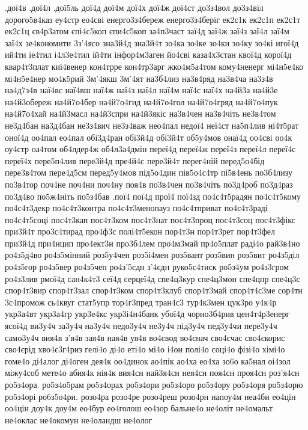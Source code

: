 {.дої4в
.дої4л
.дої5ль
дої4д
дої4м
дої4х
дої4ж
дої4ст
до3з4вол
до3з4віл
дорого5в4каз
еу4стр
ео4сві
енерго3з4береж
енерго3з4беріг
ек2с1к
ек2с1п
ек2с1т
ек2с1ц
єв4р3атом
єпі4с5коп
єпи4с5коп
за4п3част
заї4д
заї4ж
заї4з
заї4л
заї4м
заї4х
зе4кономити
3з'4ясо
зна3й4д
зна3й4т
зо4ка
зо4ке
зо4ки
зо4ку
зо4кі
игої4д
ий4ти
іе4тил
і4л3е4тил
ій4ти
інфор4м3аген
йо4сві
каза4х3стан
квої4д
корої4д
квар4т3плат
киї4венер
кон4трре
кон4тр3арг
жко4м5а4том
кому4ненерг
мі4н5е4ко
мі4н5е4нер
мо4к5рий
3м'4якш
3м'4ят
на3б4лиз
на3в4ряд
на3в4ча
на3з4в
на4д7з4в
наї4вс
наї4вш
наї4ж
наї4з
наї4л
наї4м
наї4с
наї4х
на4й3а
на4й3е
на4й3обереж
на4й7о4бер
на4й7о4гид
на4й7о4гол
на4й7о4гряд
на4й7о4пук
на4й7о4хай
на4й3масл
на4й3спри
на4й3якіс
на3в4чен
на3в4чіть
не3в4том
не3д4бан
на3д4бан
не3з4вич
не3з4важ
нео4пал
недої4
неї4ст
на5п4лив
ні4т5рат
оної4д
оо4пал
ео4пал
обі3д4ран
обі3й4д
обі3й4т
об5у4мов
онаї4д
оо4сві
оо4к
оу4стр
оа4том
об4лдер4ж
об4л3а4дмін
переї4д
переї4ж
переї4з
переї4л
переї4с
переї4х
пере5п4лив
пере3й4д
пре4й4с
пере3й4т
перег4ній
перед5о4бід
пере3в4том
пере4д5см
перед5у4мов
під5о4дин
пів5о4с4тр
пі5в4ень
по3б4лизу
по3в4тор
поч4не
поч4ни
поч4ну
поя4в
по3в4чен
по3в4чіть
по3д4роб
по3д4раз
по3д4во
по5ж4ніть
по5з4бав
.пої4
пої4д
прої4
пої4зд
по4с4т5радян
по4с4т5кому
по4с4т3декр
по4с4т3контра
по4с4т3менопауз
по4с4тприват
по4с4т3раді
по4с4т5соці
пос4т3кап
пос4т3ком
пос4т3нат
пос4т3проц
пос4т3соц
пос4т3фікс
при3й4т
про3с4тирад
про4ф3с
полі4т5екон
пор4т3н
пор4т3рет
пор4т3фел
при3й4д
при4нцип
про4ект3н
про3б4лем
про4м3май
пр4о5плат
раді4о
рай3в4но
ро4з5д4во
ро4з5мінний
роз5у4чен
роз5і4мен
роз5вант
роз5вин
роз5вит
ро4з5діл
ро4з5гор
ро4з5вер
ро4з5чеп
ро4з'5єдн
з'4єдн
руко5с4тиск
ро5з4ум
ро4з3гром
ро4з3лив
рмої4д
сан4к4т3
сеї4д
серцеї4д
спе4ц3кур
спе4ц3мон
спе4цпр
спе4ц3с
спор4т3вир
спор4т3зал
спор4т3ком
спор4т3клуб
спор4т3май
спор4т4с3ме
сор4тн
3с4промож
сь4квуг
стат5упр
тор4г3пред
тран4с3
тур4к3мен
цук3ро
у4к4р
укр3а4вт
укр3а4гр
укр3е4кс
укр3і4н4банк
убої4д
чорно3б4рив
цен4т4р3енерг
ясої4д
ви3у4ч
за3у4ч
на3у4ч
недо3у4ч
не3у4ч
під3у4ч
пед3у4чи
пере3у4ч
само3у4ч
вия4в
з'я4в
зая4в
ная4в
уя4в
во4євод
во4єнач
сво4єчас
сво4єкорис
сво4єрід
хво4є3г4риз
гелі4о
ді4о
еті4о
мі4о
і4он
полі4о
соці4о
фізі4о
хімі4о
гоме4о
ді4алог
ді4оген
дея4к
оо4динок
ао4пік
ао4ха
ео4ха
зо6о
ка5нал
оі4зол
міжу4соб
мете4о
абия4к
нія4к
вия4сн
най3я4сн
нея4сн
поя4сн
проя4сн
роз'я4сн
ро5з4ора.
ро5з4о5рам
ро5з4орах
ро5з4ори
ро5з4оро
ро5з4ору
ро5з4оря
ро5з4орю
ро5з4орі
ро6з5о4ри.
розо4ра
розо4ре
розо4реш
розо4рн
напоу4м
неа4би
ео4цін
оо4цін
доу4к
доу4м
ео4бур
ео4голош
ео4зор
бальне4о
не4оліт
не4омальт
не4оклас
не4окомун
не4оландш
не4олог
}
